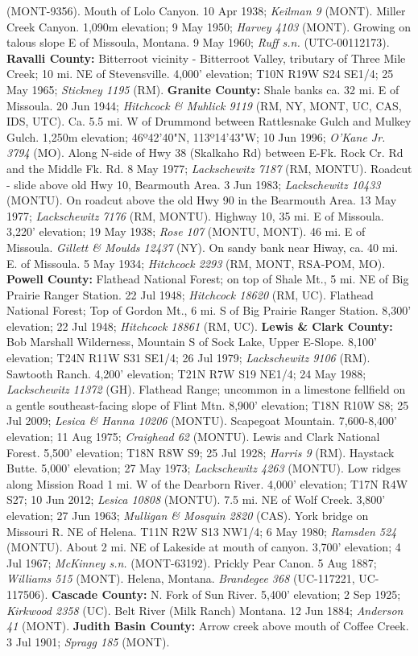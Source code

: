 (MONT-9356).  Mouth of Lolo Canyon. 10 Apr 1938; \textit{Keilman 9} (MONT).  Miller Creek Canyon. 1,090m elevation; 9 May 1950; \textit{Harvey 4103} (MONT).  Growing on talous slope E of Missoula, Montana. 9 May 1960; \textit{Ruff s.n.} (UTC-00112173).  \textbf{Ravalli County:}  Bitterroot vicinity - Bitterroot Valley, tributary of Three Mile Creek; 10 mi. NE of Stevensville. 4,000' elevation; T10N R19W S24 SE1/4; 25 May 1965; \textit{Stickney 1195} (RM).  \textbf{Granite County:}  Shale banks ca. 32 mi. E of Missoula. 20 Jun 1944; \textit{Hitchcock \& Muhlick 9119} (RM, NY, MONT, UC, CAS, IDS, UTC).  Ca. 5.5 mi. W of Drummond between Rattlesnake Gulch and Mulkey Gulch. 1,250m elevation; 46º42'40"N, 113º14'43"W; 10 Jun 1996; \textit{O'Kane Jr. 3794} (MO).  Along N-side of Hwy 38 (Skalkaho Rd) between E-Fk. Rock Cr. Rd and the Middle Fk. Rd. 8 May 1977; \textit{Lackschewitz 7187} (RM, MONTU).  Roadcut - slide above old Hwy 10, Bearmouth Area. 3 Jun 1983; \textit{Lackschewitz 10433} (MONTU).  On roadcut above the old Hwy 90 in the Bearmouth Area. 13 May 1977; \textit{Lackschewitz 7176} (RM, MONTU).  Highway 10, 35 mi. E of Missoula. 3,220' elevation; 19 May 1938; \textit{Rose 107} (MONTU, MONT).  46 mi. E of Missoula. \textit{Gillett \& Moulds 12437} (NY).  On sandy bank near Hiway, ca. 40 mi. E. of Missoula. 5 May 1934; \textit{Hitchcock 2293} (RM, MONT, RSA-POM, MO).  \textbf{Powell County:}  Flathead National Forest; on top of Shale Mt., 5 mi. NE of Big Prairie Ranger Station. 22 Jul 1948; \textit{Hitchcock 18620} (RM, UC).  Flathead National Forest; Top of Gordon Mt., 6 mi. S of Big Prairie Ranger Station. 8,300' elevation; 22 Jul 1948; \textit{Hitchcock 18861} (RM, UC).  \textbf{Lewis \& Clark County:}  Bob Marshall Wilderness, Mountain S of Sock Lake, Upper E-Slope. 8,100' elevation; T24N R11W S31 SE1/4; 26 Jul 1979; \textit{Lackschewitz 9106} (RM).  Sawtooth Ranch. 4,200' elevation; T21N R7W S19 NE1/4; 24 May 1988; \textit{Lackschewitz 11372} (GH).  Flathead Range; uncommon in a limestone fellfield on a gentle southeast-facing slope of Flint Mtn. 8,900' elevation; T18N R10W S8; 25 Jul 2009; \textit{Lesica \& Hanna 10206} (MONTU).  Scapegoat Mountain. 7,600-8,400' elevation; 11 Aug 1975; \textit{Craighead 62} (MONTU).  Lewis and Clark National Forest. 5,500' elevation; T18N R8W S9; 25 Jul 1928; \textit{Harris 9} (RM).  Haystack Butte. 5,000' elevation; 27 May 1973; \textit{Lackschewitz 4263} (MONTU).  Low ridges along Mission Road 1 mi. W of the Dearborn River. 4,000' elevation; T17N R4W S27; 10 Jun 2012; \textit{Lesica 10808} (MONTU).  7.5 mi. NE of Wolf Creek. 3,800' elevation; 27 Jun 1963; \textit{Mulligan \& Mosquin 2820} (CAS).  York bridge on Missouri R. NE of Helena. T11N R2W S13 NW1/4; 6 May 1980; \textit{Ramsden 524} (MONTU).  About 2 mi. NE of Lakeside at mouth of canyon. 3,700' elevation; 4 Jul 1967; \textit{McKinney s.n.} (MONT-63192).  Prickly Pear Canon. 5 Aug 1887; \textit{Williams 515} (MONT).  Helena, Montana. \textit{Brandegee 368} (UC-117221, UC-117506).  \textbf{Cascade County:}  N. Fork of Sun River. 5,400' elevation; 2 Sep 1925; \textit{Kirkwood 2358} (UC).  Belt River (Milk Ranch) Montana. 12 Jun 1884; \textit{Anderson 41} (MONT).  \textbf{Judith Basin County:}  Arrow creek above mouth of Coffee Creek. 3 Jul 1901; \textit{Spragg 185} (MONT).  